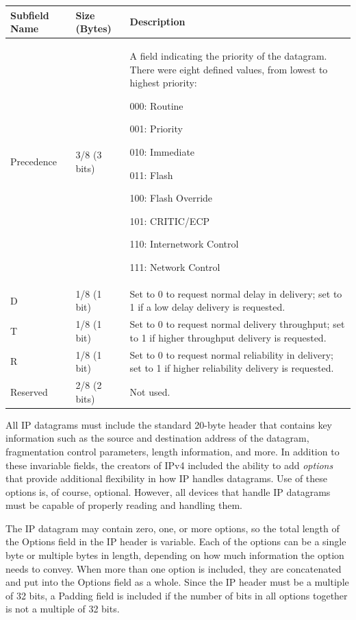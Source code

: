 \begin{longtable}[]{@{}lll@{}}
\toprule
Subfield Name & Size (Bytes) & Description\tabularnewline
\midrule
\endhead
\begin{minipage}[t]{0.30\columnwidth}\raggedright
Precedence\strut
\end{minipage} & \begin{minipage}[t]{0.30\columnwidth}\raggedright
3/8 (3 bits)\strut
\end{minipage} & \begin{minipage}[t]{0.30\columnwidth}\raggedright
A field indicating the priority of the datagram. There were eight
defined values, from lowest to highest priority:

000: Routine

001: Priority

010: Immediate

011: Flash

100: Flash Override

101: CRITIC/ECP

110: Internetwork Control

111: Network Control\strut
\end{minipage}\tabularnewline
D & 1/8 (1 bit) & Set to 0 to request normal delay in delivery; set to 1
if a low delay delivery is requested.\tabularnewline
T & 1/8 (1 bit) & Set to 0 to request normal delivery throughput; set to
1 if higher throughput delivery is requested.\tabularnewline
R & 1/8 (1 bit) & Set to 0 to request normal reliability in delivery;
set to 1 if higher reliability delivery is requested.\tabularnewline
Reserved & 2/8 (2 bits) & Not used.\tabularnewline
\bottomrule
\end{longtable}



All
IP datagrams must include the standard 20-byte header that contains key
information such as the source and destination address of the datagram,
fragmentation control parameters, length information, and more. In
addition to these invariable fields, the creators of IPv4 included the
ability to add \emph{options} that provide additional flexibility in
how IP handles datagrams. Use of these options is, of course, optional.
However, all devices that handle IP datagrams must be capable of
properly reading and handling them.

The IP datagram may contain zero, one, or more options, so the total
length of the Options field in the IP header is variable. Each of the
options can be a single byte or multiple bytes in length, depending on
how much information the option needs to convey. When more than one
option is included, they are concatenated and put into the Options field
as a whole. Since the IP header must be a multiple of 32 bits, a Padding
field is included if the number of bits in all options together is not a
multiple of 32 bits.

